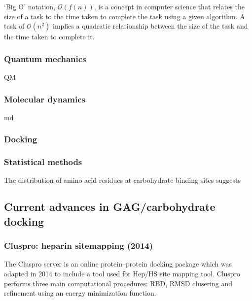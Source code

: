 \documentclass[journal=jctcce,manuscript=article]{achemso}
\begin{document}
{`Big O'  notation, $\mathcal{O}(f(n))$, is a concept in computer science that relates the size of a task to the time taken to complete the task using a given algorithm. A task of $\mathcal{O}(n^{2})$ implies a quadratic relationship between the size of the task and the time taken to complete it.

\subsubsection{Quantum mechanics}
\Ac{QM}

\subsubsection{Molecular dynamics}
\Ac{md}

\subsubsection{Docking}

\subsubsection{Statistical methods}

The distribution of amino acid residues at carbohydrate binding sites suggests

\subsection{Current advances in GAG/carbohydrate docking}

\subsubsection{Cluspro: heparin sitemapping (2014)}

The Cluspro server is an online protein--protein docking package which was adapted in 2014 to include a tool used for \ac{Hep}/\ac{HS} site mapping tool.\cite{Comeau2007ClusPro:Server, Mottarella2014DockingProteins,Kozakov2017TheDocking.} 
Cluspro performs three main computational procedures: \ac{RBD}, \ac{RMSD} clusering and refinement using an energy minimization function.\cite{Kozakov2017TheDocking.} 

}
\end{document}
